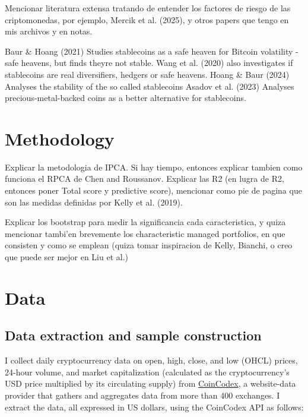 \documentclass[
  11pt,
  a4paper,
  openany]{scrreprt}
\begin{document}
Mencionar literatura extensa tratando de entender los factores de riesgo
de las criptomonedas, por ejemplo, Mercik et al. (2025), y otros papers
que tengo en mis archivos y en notas.

Baur \& Hoang (2021) Studies stablecoins as a safe heaven for Bitcoin
volatility - safe heavens, but finds theyre not stable. Wang et al.
(2020) also investigates if stablecoins are real diversifiers, hedgers
or safe heavens. Hoang \& Baur (2024) Analyses the stability of the so
called stablecoins Asadov et al. (2023) Analyses precious-metal-backed
coins as a better alternative for stablecoins.


\chapter{Methodology}\label{methodology}

Explicar la metodologia de IPCA. Si hay tiempo, entonces explicar
tambien como funciona el RPCA de Chen and Roussanov. Explicar las R2 (en
lugra de R2, entonces poner Total score y predictive score), mencionar
como pie de pagina que son las medidas definidas por Kelly et al.
(2019).

Explicar los bootstrap para medir la significancia cada caracteristica,
y quiza mencionar tambi'en brevemente los characteristic managed
portfolios, en que consisten y como se emplean (quiza tomar inspiracion
de Kelly, Bianchi, o creo que puede ser mejor en Liu et al.)


\chapter{Data}\label{data}

\section{Data extraction and sample
construction}\label{data-extraction-and-sample-construction}

I collect daily cryptocurrency data on open, high, close, and low (OHCL)
prices, 24-hour volume, and market capitalization (calculated as the
cryptocurrency's USD price multiplied by its circulating supply) from
\href{https://coincodex.com/}{CoinCodex}, a website-data provider that
gathers and aggregates data from more than 400 exchanges. I extract the
data, all expressed in US dollars, using the CoinCodex API as follows:
\end{document}
